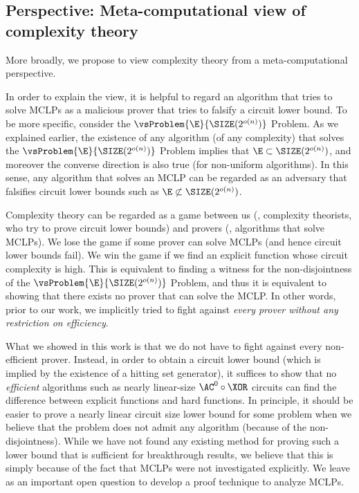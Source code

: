 \documentclass{toc}
\begin{document}
\subsection{Perspective: Meta-computational view of complexity theory}

More broadly, we propose to view complexity theory from a meta-computational perspective.
%

In order to explain the view, it is helpful to regard an algorithm that tries to solve MCLPs
as a malicious prover that tries to falsify a circuit lower bound.
To be more specific, consider the $\vsProblem{\E}{\SIZE(2^{o(n)})}$ Problem.
As we explained earlier,
the existence of
any algorithm (of any complexity) that solves the $\vsProblem{\E}{\SIZE(2^{o(n)})}$ Problem
implies that $\E \subset \SIZE(2^{o(n)})$,
and moreover the converse direction is also true (for non-uniform algorithms).
In this sense, any algorithm that solves an MCLP can be regarded as an adversary that falsifies circuit lower bounds such as $\E \not\subset \SIZE(2^{o(n)})$.

Complexity theory can be regarded as a game between us (\ie, complexity theorists, who try to prove circuit lower bounds) and provers (\ie, algorithms that solve MCLPs).
We lose the game if some prover can solve MCLPs (and hence circuit lower bounds fail).
We win the game if we find an explicit function whose circuit complexity is high.
This is equivalent to finding a witness for the non-disjointness of the $\vsProblem{\E}{\SIZE(2^{o(n)})}$ Problem,
and thus it is equivalent to showing that there exists no prover that can solve the MCLP.
In other words,
prior to our work,
we implicitly tried to fight against \emph{every prover without any restriction on efficiency}.

What we showed in this work is that we do not have to fight against every non-efficient prover.
Instead,
in order to obtain a circuit lower bound (which is implied by the existence of a hitting set generator),
it suffices to show that no \emph{efficient} algorithms such as nearly linear-size $\AC^0 \circ \XOR$ circuits
can find
the difference between explicit functions and hard functions.
In principle,
it should be easier to prove a nearly linear circuit size lower bound for some problem
when we believe that the problem does not admit any algorithm (because of the non-disjointness).
While we have not found any existing method for proving such a lower bound that is sufficient for breakthrough results,
we believe that this is simply because of the fact that MCLPs were not investigated explicitly.
We leave as an important open question to develop a proof technique to analyze MCLPs.
\end{document}
